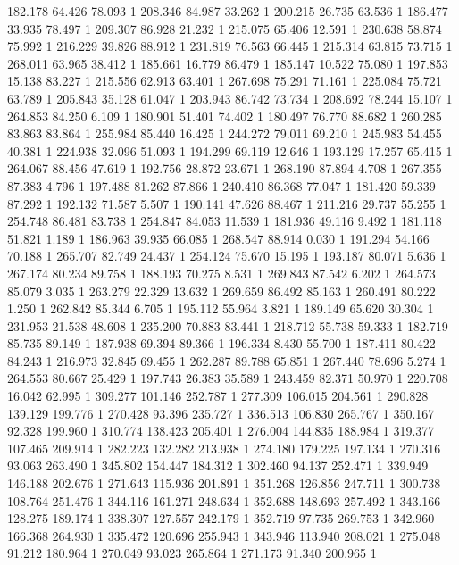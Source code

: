 	182.178	64.426	78.093	1
	208.346	84.987	33.262	1
	200.215	26.735	63.536	1
	186.477	33.935	78.497	1
	209.307	86.928	21.232	1
	215.075	65.406	12.591	1
	230.638	58.874	75.992	1
	216.229	39.826	88.912	1
	231.819	76.563	66.445	1
	215.314	63.815	73.715	1
	268.011	63.965	38.412	1
	185.661	16.779	86.479	1
	185.147	10.522	75.080	1
	197.853	15.138	83.227	1
	215.556	62.913	63.401	1
	267.698	75.291	71.161	1
	225.084	75.721	63.789	1
	205.843	35.128	61.047	1
	203.943	86.742	73.734	1
	208.692	78.244	15.107	1
	264.853	84.250	6.109	1
	180.901	51.401	74.402	1
	180.497	76.770	88.682	1
	260.285	83.863	83.864	1
	255.984	85.440	16.425	1
	244.272	79.011	69.210	1
	245.983	54.455	40.381	1
	224.938	32.096	51.093	1
	194.299	69.119	12.646	1
	193.129	17.257	65.415	1
	264.067	88.456	47.619	1
	192.756	28.872	23.671	1
	268.190	87.894	4.708	1
	267.355	87.383	4.796	1
	197.488	81.262	87.866	1
	240.410	86.368	77.047	1
	181.420	59.339	87.292	1
	192.132	71.587	5.507	1
	190.141	47.626	88.467	1
	211.216	29.737	55.255	1
	254.748	86.481	83.738	1
	254.847	84.053	11.539	1
	181.936	49.116	9.492	1
	181.118	51.821	1.189	1
	186.963	39.935	66.085	1
	268.547	88.914	0.030	1
	191.294	54.166	70.188	1
	265.707	82.749	24.437	1
	254.124	75.670	15.195	1
	193.187	80.071	5.636	1
	267.174	80.234	89.758	1
	188.193	70.275	8.531	1
	269.843	87.542	6.202	1
	264.573	85.079	3.035	1
	263.279	22.329	13.632	1
	269.659	86.492	85.163	1
	260.491	80.222	1.250	1
	262.842	85.344	6.705	1
	195.112	55.964	3.821	1
	189.149	65.620	30.304	1
	231.953	21.538	48.608	1
	235.200	70.883	83.441	1
	218.712	55.738	59.333	1
	182.719	85.735	89.149	1
	187.938	69.394	89.366	1
	196.334	8.430	55.700	1
	187.411	80.422	84.243	1
	216.973	32.845	69.455	1
	262.287	89.788	65.851	1
	267.440	78.696	5.274	1
	264.553	80.667	25.429	1
	197.743	26.383	35.589	1
	243.459	82.371	50.970	1
	220.708	16.042	62.995	1
	309.277	101.146	252.787	1
	277.309	106.015	204.561	1
	290.828	139.129	199.776	1
	270.428	93.396	235.727	1
	336.513	106.830	265.767	1
	350.167	92.328	199.960	1
	310.774	138.423	205.401	1
	276.004	144.835	188.984	1
	319.377	107.465	209.914	1
	282.223	132.282	213.938	1
	274.180	179.225	197.134	1
	270.316	93.063	263.490	1
	345.802	154.447	184.312	1
	302.460	94.137	252.471	1
	339.949	146.188	202.676	1
	271.643	115.936	201.891	1
	351.268	126.856	247.711	1
	300.738	108.764	251.476	1
	344.116	161.271	248.634	1
	352.688	148.693	257.492	1
	343.166	128.275	189.174	1
	338.307	127.557	242.179	1
	352.719	97.735	269.753	1
	342.960	166.368	264.930	1
	335.472	120.696	255.943	1
	343.946	113.940	208.021	1
	275.048	91.212	180.964	1
	270.049	93.023	265.864	1
	271.173	91.340	200.965	1
